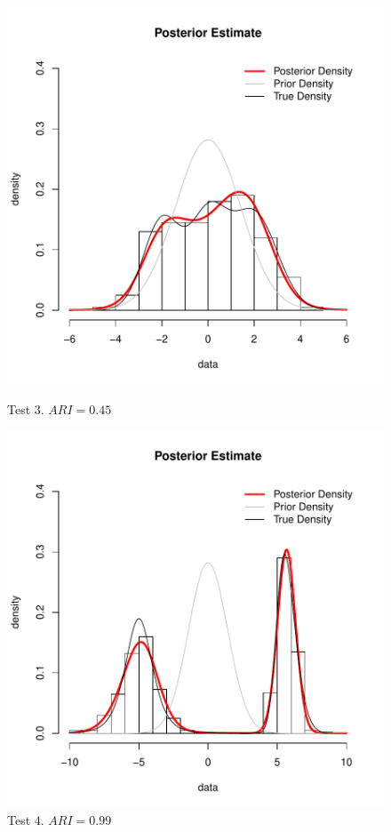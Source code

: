 \begin{figure}[h]
	\centering
	\begin{minipage}{0.5\textwidth}
		\includegraphics[scale=0.45]{etc/test3.pdf}
		\captionsetup{labelformat=empty}
		\caption{Test 3. $ARI = 0.45$}
	\end{minipage}%
	\begin{minipage}{0.5\textwidth}
		\includegraphics[scale=0.45]{etc/test4.pdf}
		\captionsetup{labelformat=empty}
		\caption{Test 4. $ARI = 0.99$}
	\end{minipage}
\end{figure}

